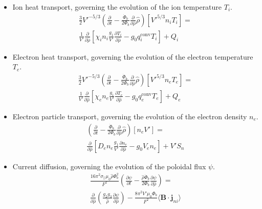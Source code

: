 \documentclass[aps, reprint, nofootinbib]{revtex4-2}
\newcommand{\rnorm}{\hat{\rho}}
\newcommand{\phibdot}{\dot{\Phi}_b}
\newcommand{\phib}{\Phi_b}
\begin{document}
\begin{itemize}
    
    \item Ion heat transport, governing the evolution of the ion temperature $T_i$.
    \begin{multline}
    \label{eq:Ti}
    \frac{3}{2} V'^{-5/3} \left(\frac{\partial }{\partial t}-\frac{\phibdot}{2\phib}\frac{\partial}{\partial\rnorm}\rnorm\right)\left[V'^{5/3} n_i T_i\right] = \\ \frac{1}{V'} \frac{\partial}{\partial \rnorm} \left[\chi_i n_i \frac{g_1}{V'} \frac{\partial T_i}{\partial \rnorm} - g_0q_i^{\mathrm{conv}}T_i\right] + Q_i
    \end{multline}

    \item Electron heat transport, governing the evolution of the electron temperature $T_e$.
    \begin{multline}
    \label{eq:Te}
    \frac{3}{2} V'^{-5/3} \left(\frac{\partial }{\partial t}-\frac{\phibdot}{2\phib}\frac{\partial}{\partial\rnorm}\rnorm\right)\left[V'^{5/3} n_e T_e\right]  = \\ \frac{1}{V'} \frac{\partial}{\partial \rnorm} \left[ \chi_e n_e \frac{g_1}{V'} \frac{\partial T_e}{\partial \rnorm} - g_0q_e^{\mathrm{conv}}T_e \right] + Q_e
    \end{multline}

    \item Electron particle transport, governing the evolution of the electron density $n_e$.
    \begin{multline}
    \label{eq:ne}
    \left(\frac{\partial}{\partial t}-\frac{\phibdot}{2\phib}\frac{\partial}{\partial\rnorm}\rnorm\right) \left[ n_e V' \right] = \\ \frac{\partial}{\partial \rnorm} \left[D_e n_e \frac{g_1}{V'} \frac{\partial n_e}{\partial \rnorm} - g_0V_e n_e\right] + V'S_n
    \end{multline}    

    \item Current diffusion, governing the evolution of the poloidal flux $\psi$.
\begin{multline}
    \label{eq:psi}
 \frac{16 \pi^2 \sigma_{||}\mu_0 \rnorm \phib^2}{F^2}\left(\frac{\partial \psi}{\partial t}-\frac{\rnorm\phibdot}{2\phib}\frac{\partial \psi}{\partial \rnorm}\right)  = \\ \frac{\partial}{\partial \rnorm} \left( \frac{g_2 g_3}{\rnorm} \frac{\partial \psi}{\partial \rnorm} \right) - \frac{8\pi^2 V' \mu_0 \phib}{F^2} \langle \mathbf{B} \cdot \mathbf{j}_{ni} \rangle 
\end{multline}    
\end{itemize}
\end{document}
